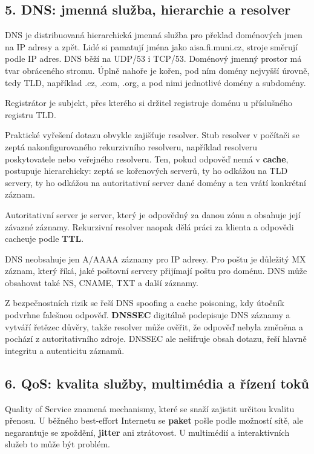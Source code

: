 \subsection*{5. DNS: jmenná služba, hierarchie a resolver}

DNS je distribuovaná hierarchická jmenná služba pro překlad doménových jmen na IP adresy a zpět. Lidé si pamatují jména jako aisa.fi.muni.cz, stroje směrují podle IP adres. DNS běží na UDP/53 i TCP/53. Doménový jmenný prostor má tvar obráceného stromu. Úplně nahoře je kořen, pod ním domény nejvyšší úrovně, tedy TLD, například .cz, .com, .org, a pod nimi jednotlivé domény a subdomény.

Registrátor je subjekt, přes kterého si držitel registruje doménu u příslušného registru TLD.

Praktické vyřešení dotazu obvykle zajišťuje resolver. Stub resolver v počítači se zeptá nakonfigurovaného rekurzivního resolveru, například resolveru poskytovatele nebo veřejného resolveru. Ten, pokud odpověď nemá v \textbf{cache}, postupuje hierarchicky: zeptá se kořenových serverů, ty ho odkážou na TLD servery, ty ho odkážou na autoritativní server dané domény a ten vrátí konkrétní záznam.

Autoritativní server je server, který je odpovědný za danou zónu a obsahuje její závazné záznamy. Rekurzivní resolver naopak dělá práci za klienta a odpovědi cacheuje podle \textbf{TTL}.

DNS neobsahuje jen A/AAAA záznamy pro IP adresy. Pro poštu je důležitý MX záznam, který říká, jaké poštovní servery přijímají poštu pro doménu. DNS může obsahovat také NS, CNAME, TXT a další záznamy.

Z bezpečnostních rizik se řeší DNS spoofing a cache poisoning, kdy útočník podvrhne falešnou odpověď. \textbf{DNSSEC} digitálně podepisuje DNS záznamy a vytváří řetězec důvěry, takže resolver může ověřit, že odpověď nebyla změněna a pochází z autoritativního zdroje. DNSSEC ale nešifruje obsah dotazu, řeší hlavně integritu a autenticitu záznamů.

\subsection*{6. QoS: kvalita služby, multimédia a řízení toků}

Quality of Service znamená mechanismy, které se snaží zajistit určitou kvalitu přenosu. U běžného best-effort Internetu se \textbf{paket} pošle podle možností sítě, ale negarantuje se zpoždění, \textbf{jitter} ani ztrátovost. U multimédií a interaktivních služeb to může být problém.

